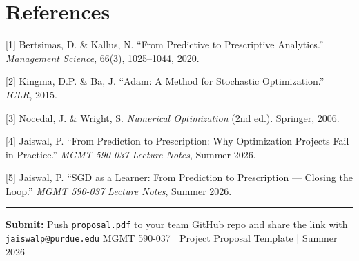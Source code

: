\documentclass[11pt]{article}
\begin{document}
\section*{References}

[1] \; Bertsimas, D. \& Kallus, N. ``From Predictive to Prescriptive Analytics.'' \textit{Management Science}, 66(3), 1025--1044, 2020.

[2] \; Kingma, D.P. \& Ba, J. ``Adam: A Method for Stochastic Optimization.'' \textit{ICLR}, 2015.

[3] \; Nocedal, J. \& Wright, S. \textit{Numerical Optimization} (2nd ed.). Springer, 2006.

[4] \; Jaiswal, P. ``From Prediction to Prescription: Why Optimization Projects Fail in Practice.'' \textit{MGMT 590-037 Lecture Notes}, Summer 2026.

[5] \; Jaiswal, P. ``SGD as a Learner: From Prediction to Prescription --- Closing the Loop.'' \textit{MGMT 590-037 Lecture Notes}, Summer 2026.

\vfill\hrule\vspace{3pt}
{\small\color{navyblue}
\textbf{Submit:} Push \texttt{proposal.pdf} to your team GitHub repo and share the link with \texttt{jaiswalp@purdue.edu}
\hfill MGMT 590-037 \;|\; Project Proposal Template \;|\; Summer 2026}
\end{document}

